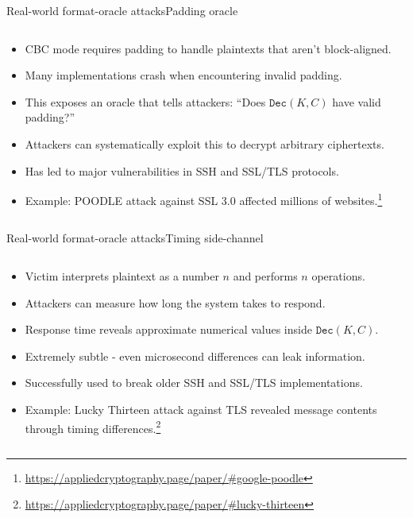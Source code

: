\documentclass[aspectratio=169, lualatex, handout]{beamer}
\begin{document}
\begin{frame}{Real-world format-oracle attacks}{Padding oracle}
	\begin{columns}[c]
		\begin{column}{1\textwidth}
			\begin{itemize}
				\item CBC mode requires padding to handle plaintexts that aren't block-aligned.
				\item Many implementations crash when encountering invalid padding.
				\item This exposes an oracle that tells attackers: ``Does $\texttt{Dec}(K, C)$ have valid padding?''
				\item Attackers can systematically exploit this to decrypt arbitrary ciphertexts.
				\item Has led to major vulnerabilities in SSH and SSL/TLS protocols.
				\item Example: POODLE attack against SSL 3.0 affected millions of websites.\footnote{\url{https://appliedcryptography.page/paper/\#google-poodle}}
			\end{itemize}
		\end{column}
	\end{columns}
\end{frame}

\begin{frame}{Real-world format-oracle attacks}{Timing side-channel}
	\begin{columns}[c]
		\begin{column}{1\textwidth}
			\begin{itemize}
				\item Victim interprets plaintext as a number $n$ and performs $n$ operations.
				\item Attackers can measure how long the system takes to respond.
				\item Response time reveals approximate numerical values inside $\texttt{Dec}(K, C)$.
				\item Extremely subtle - even microsecond differences can leak information.
				\item Successfully used to break older SSH and SSL/TLS implementations.
				\item Example: Lucky Thirteen attack against TLS revealed message contents through timing differences.\footnote{\url{https://appliedcryptography.page/paper/\#lucky-thirteen}}
			\end{itemize}
		\end{column}
	\end{columns}
\end{frame}
\end{document}
